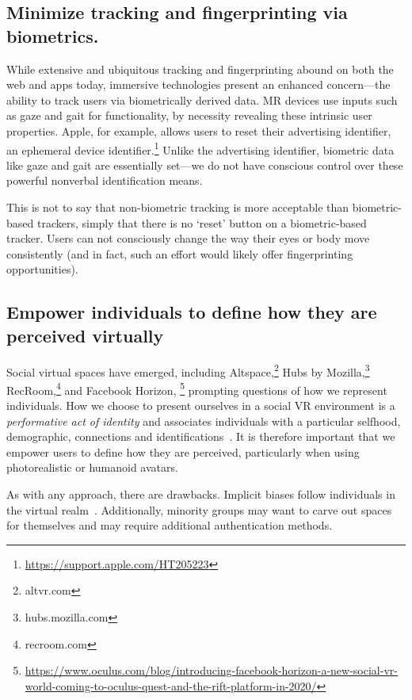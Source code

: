 \subsection{Minimize tracking and fingerprinting via biometrics.}
While extensive and ubiquitous tracking and fingerprinting abound on both the web and apps today, immersive technologies present an enhanced concern---the ability to track users via biometrically derived data. MR devices use inputs such as gaze and gait for functionality, by necessity revealing these intrinsic user properties. Apple, for example, allows users to reset their advertising identifier, an ephemeral device identifier.\footnote{\url{https://support.apple.com/HT205223}} Unlike the advertising identifier, biometric data like gaze and gait are essentially set---we do not have conscious control over these powerful nonverbal identification means.	

This is not to say that non-biometric tracking is more acceptable than biometric-based trackers, simply that there is no `reset' button on a biometric-based tracker. Users can not consciously change the way their eyes or body move consistently (and in fact, such an effort would likely offer fingerprinting opportunities).

\subsection{Empower individuals to define how they are perceived virtually}
Social virtual spaces have emerged, including Altspace,\footnote{altvr.com} Hubs by Mozilla,\footnote{hubs.mozilla.com} RecRoom,\footnote{recroom.com} and Facebook Horizon,
\footnote{\url{https://www.oculus.com/blog/introducing-facebook-horizon-a-new-social-vr-world-coming-to-oculus-quest-and-the-rift-platform-in-2020/}}
 prompting questions of how we represent individuals. How we choose to present ourselves in a social VR environment is a \emph{performative act of identity} and associates individuals with a particular selfhood, demographic, connections and identifications~\cite{cover2012performing}. It is therefore important that we empower users to define how they are perceived, particularly when using photorealistic or humanoid avatars.

As with any approach, there are drawbacks. Implicit biases follow individuals in the virtual realm~\cite{maloney}. Additionally, minority groups may want to carve out spaces for themselves and may require additional authentication methods.


